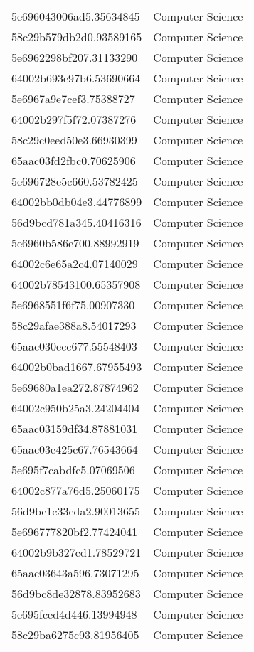 \begin{tabular}{ll}
5e696043006ad5.35634845 & Computer Science \\
58c29b579db2d0.93589165 & Computer Science \\
5e6962298bf207.31133290 & Computer Science \\
64002b693e97b6.53690664 & Computer Science \\
5e6967a9e7cef3.75388727 & Computer Science \\
64002b297f5f72.07387276 & Computer Science \\
58c29c0eed50e3.66930399 & Computer Science \\
65aac03fd2fbc0.70625906 & Computer Science \\
5e696728e5c660.53782425 & Computer Science \\
64002bb0db04e3.44776899 & Computer Science \\
56d9bcd781a345.40416316 & Computer Science \\
5e6960b586e700.88992919 & Computer Science \\
64002c6e65a2c4.07140029 & Computer Science \\
64002b78543100.65357908 & Computer Science \\
5e6968551f6f75.00907330 & Computer Science \\
58c29afae388a8.54017293 & Computer Science \\
65aac030ecc677.55548403 & Computer Science \\
64002b0bad1667.67955493 & Computer Science \\
5e69680a1ea272.87874962 & Computer Science \\
64002c950b25a3.24204404 & Computer Science \\
65aac03159df34.87881031 & Computer Science \\
65aac03e425c67.76543664 & Computer Science \\
5e695f7cabdfc5.07069506 & Computer Science \\
64002c877a76d5.25060175 & Computer Science \\
56d9bc1c33cda2.90013655 & Computer Science \\
5e696777820bf2.77424041 & Computer Science \\
64002b9b327cd1.78529721 & Computer Science \\
65aac03643a596.73071295 & Computer Science \\
56d9bc8de32878.83952683 & Computer Science \\
5e695fced4d446.13994948 & Computer Science \\
58c29ba6275c93.81956405 & Computer Science \\

\end{tabular}
